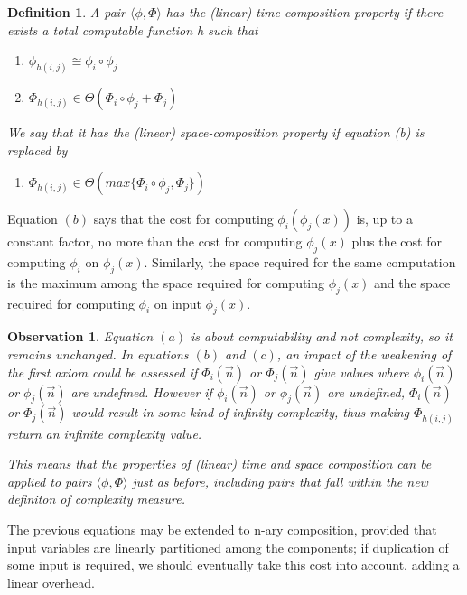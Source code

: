 \documentclass[10pt, a4paper, oneside, titlepage, draft]{article}
\newtheorem{definition}[shrd]{Definition}
\newtheorem{observation}{Observation}[shrd]
\begin{document}
\begin{definition}
    A pair $\langle \phi, \Phi \rangle$ has the (linear) time-composition property if there exists a total computable function h such that 
    \begin{enumerate}[label=(\alph*)]
        \item $ \phi_{h(i,j)} \cong \phi_i \circ \phi_j $
        \item $ \Phi_{h(i,j)} \in \Theta(\Phi_i \circ \phi_j + \Phi_j) $
    \end{enumerate}
    We say that it has the (linear) space-composition property if equation (b) is replaced by
    \begin{enumerate}[label=(c)]
        \item $ \Phi_{h(i,j)} \in \Theta(max \{ \Phi_i \circ \phi_j, \Phi_j \}) $
    \end{enumerate}
\end{definition}

\noindent Equation $(b)$ says that the cost for computing $\phi_i(\phi_j(x))$ is, up to a constant factor, no more than the cost for computing $\phi_j(x)$ plus the cost for computing $\phi_i$ on $\phi_j(x)$. Similarly, the space required for the same computation is the maximum among the space required for computing $\phi_j(x)$ and the space required for computing $\phi_i$ on input $\phi_j(x)$. 

\begin{observation}
    Equation $(a)$ is about computability and not complexity, so it remains unchanged. In equations $(b)$ and $(c)$, an impact of the weakening of the first axiom could be assessed if $\Phi_i(\vec{n})$ or $\Phi_j(\vec{n})$ give values where $\phi_i(\vec{n})$ or $\phi_j(\vec{n})$ are undefined. However if $\phi_i(\vec{n})$ or $\phi_j(\vec{n})$ are undefined, $\Phi_i(\vec{n})$ or $\Phi_j(\vec{n})$ would result in some kind of infinity complexity, thus making $\Phi_{h(i,j)}$ return an infinite complexity value.
    
    This means that the properties of (linear) time and space composition can be applied to pairs $\langle \phi,\Phi \rangle$ just as before, including pairs that fall within the new definiton of complexity measure.
\end{observation}

The previous equations may be extended to n-ary composition, provided that input variables are linearly partitioned among the components; if duplication of some input is required, we should eventually take this cost into account, adding a linear overhead. 
\end{document}
